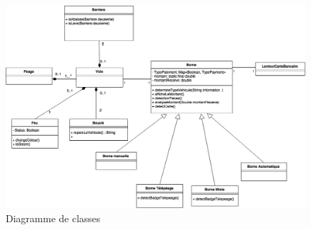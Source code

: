 \label{Cap:TD3}

\begin{figure}[!htb]
    \centering
    \includegraphics[scale=0.45]{02_Desenvolvimento/TD3/images/DiagrammeClasse.png}
    \caption{Diagramme de classes}
    \label{fig:DARentrer}
\end{figure}